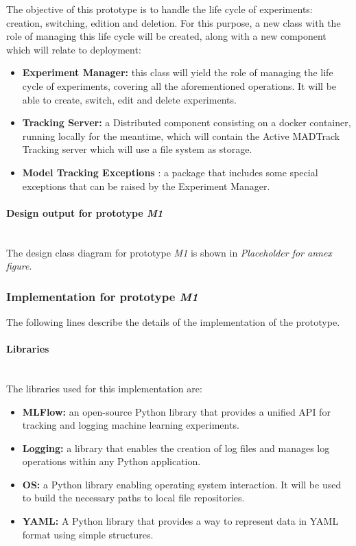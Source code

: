 The objective of this prototype is to handle the life cycle of experiments: creation, switching,
edition and deletion. For this purpose, a new class with the role of managing this life cycle will be created, along with a new component which 
will relate to deployment:

\begin{itemize}
    \item \textbf{Experiment Manager: }this class will yield the role of managing the life cycle of experiments, covering all the aforementioned 
    operations. It will be able to create, switch, edit and delete experiments.

    \item \textbf{Tracking Server: }a Distributed component consisting on a docker container, running locally for the meantime, which will contain
    the Active MADTrack Tracking server which will use a file system as storage.

    \item \textbf{Model Tracking Exceptions }: a package that includes some special exceptions that can be raised by the Experiment Manager. 
\end{itemize}

\paragraph{Design output for prototype \emph{M1}}\mbox{}\\

The design class diagram for prototype \emph{M1} is shown in \emph{Placeholder for annex figure}.

\subsubsection{Implementation for prototype \emph{M1}}

The following lines describe the details of the implementation of the prototype.

\paragraph{Libraries} \mbox{}\\

The libraries used for this implementation are:

\begin{itemize}
    \item \textbf{MLFlow: }an open-source Python library that provides a unified API for tracking and logging machine learning experiments.
    \item \textbf{Logging: }a library that enables the creation of log files and manages log operations within any Python application.
    \item \textbf{OS: }a Python library enabling operating system interaction. It will be used to build the necessary paths to local file repositories.
    \item \textbf{YAML: }A Python library that provides a way to represent data in YAML format using simple structures.
\end{itemize}

